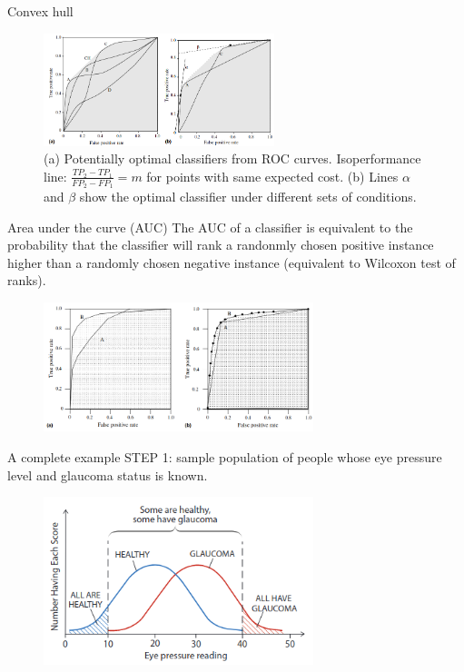 \documentclass{beamer}
\begin{document}
\begin{frame}{Convex hull}
  \begin{figure}
    \includegraphics[width=0.6\textwidth]{ROCconvexhull}
    \caption{(a) Potentially optimal classifiers from ROC curves. Isoperformance line: $\frac{TP_2-TP_1}{FP_2-FP_1}=m$ for points with same expected cost. (b) Lines $\alpha$ and $\beta$ show the optimal classifier under different sets of conditions\cite{fawcettIntroductionROCAnalysis2006}.}
  \end{figure}
\end{frame}


\begin{frame}{Area under the curve (AUC)}
  The AUC of a classifier is equivalent to the probability that the classifier will rank a randonmly chosen positive instance higher than a randomly chosen negative instance (equivalent to Wilcoxon test of ranks)\cite{fawcettIntroductionROCAnalysis2006}.
  \begin{figure}
    \includegraphics[width=0.7\textwidth]{AUC}
  \end{figure}
\end{frame}

\begin{frame}{A complete example\cite{swetsBetterDecisionsScience2000}}
  STEP 1: sample population of people whose eye pressure level and glaucoma status is known.
  \begin{figure}
    \includegraphics[width=0.7\textwidth]{ROCEx1}
  \end{figure}
\end{frame}
\end{document}
